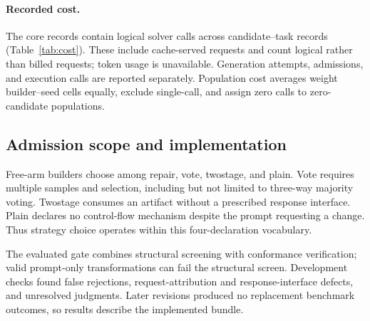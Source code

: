 \begin{table}[H]
\centering\small

\caption{Corrected sensitivities on core-400, 18 cells. CIs are unadjusted.
K-matched comparisons always retain single-call; R2 comparisons exclude single-call and
are conditional on the observed acquisition groups.}
\label{tab:sensitivity}
\end{table}

\paragraph{Recorded cost.}
The core records contain \RevisionLogicalCalls{} logical solver calls
across \RevisionCostRows{} candidate--task records
(Table~\ref{tab:cost}). These include cache-served requests and count
logical rather than billed requests; token usage is unavailable.
Generation attempts, admissions,
and execution calls are reported separately. Population cost averages
weight builder--seed cells equally, exclude single-call, and assign
zero calls to zero-candidate populations.

\begin{table}[H]
\centering\small

\caption{Descriptive canonical cost audit on core-400, 18 cells per arm.
Logged logical calls are not billable requests or token counts. The last
column averages candidate-population calls per task over cells.}
\label{tab:cost}
\end{table}

\FloatBarrier
\subsection{Admission scope and implementation}
\label{app:free-vocabulary}
Free-arm builders choose among repair, vote, twostage, and plain.
Vote requires multiple samples and selection, including but not limited
to three-way majority voting. Twostage consumes an artifact without a
prescribed response interface. Plain declares no control-flow mechanism
despite the prompt requesting a change. Thus strategy choice operates
within this four-declaration vocabulary.

The evaluated gate combines structural screening with conformance
verification; valid prompt-only transformations can fail the structural
screen. Development checks found false rejections, request-attribution
and response-interface defects, and unresolved judgments. Later
revisions produced no replacement benchmark outcomes, so results
describe the implemented bundle.

